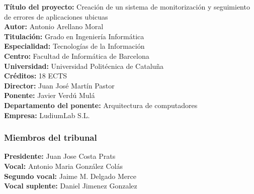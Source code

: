 \textbf{Título del proyecto:} Creación de un sistema de monitorización y seguimiento de errores de aplicaciones ubicuas \\
\textbf{Autor:} Antonio Arellano Moral \\
\textbf{Titulación:} Grado en Ingeniería Informática \\
\textbf{Especialidad:} Tecnologías de la Información \\
\textbf{Centro:} Facultad de Informática de Barcelona \\
\textbf{Universidad:} Universidad Politécnica de Cataluña \\
\textbf{Créditos:} 18 ECTS \\
\textbf{Director:} Juan José Martín Pastor \\
\textbf{Ponente:} Javier Verdú Mulá \\
\textbf{Departamento del ponente:} Arquitectura de computadores \\
\textbf{Empresa:} LudiumLab S.L. \\

\begin{center}
	\subsubsection{Miembros del tribunal}
\end{center}

\textbf{Presidente:} Juan Jose Costa Prats \\
\textbf{Vocal:} Antonio Maria González Colás \\
\textbf{Segundo vocal:} Jaime M. Delgado Merce \\
\textbf{Vocal suplente:} Daniel Jimenez Gonzalez \\

